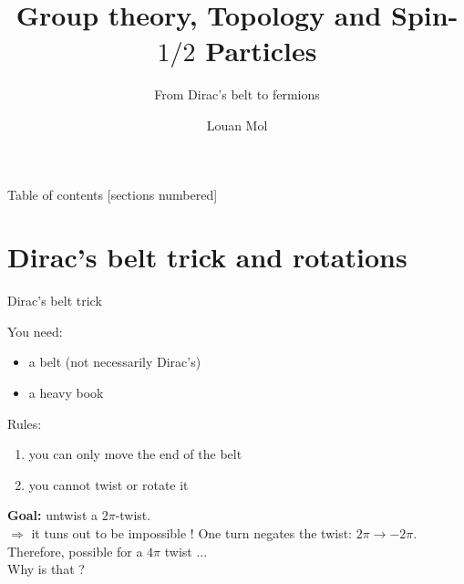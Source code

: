 \documentclass[9pt]{beamer}
\title{Group theory, Topology and Spin-$1/2$ Particles}
\subtitle{From Dirac's belt to fermions}
\date{}
\author{Louan Mol}
\institute{Unversité Libre de Bruxelles\\[2cm]{\small Brussels Summer School of Mathematics 2022}}
\renewcommand{\emph}{\alert}
\begin{document}
\maketitle

\nocite{*}

\begin{frame}{Table of contents}
    [sections numbered]
    \tableofcontents%
\end{frame}

\section{Dirac's belt trick and rotations}

\begin{frame}{Dirac's belt trick}
    
    You need:
    \begin{itemize}
      \item a belt (not necessarily Dirac's)
      \item a heavy book
    \end{itemize}
    Rules:
    \begin{enumerate}
      \item you can only move the end of the belt
      \item you cannot twist or rotate it
    \end{enumerate}
    \textbf{Goal:} untwist a $2\pi$-twist.\\[0.5cm]
      $\Rightarrow$ it tuns out to be \emph{impossible} ! One turn negates the twist: $2\pi\to-2\pi$. \\[0.5cm]

      Therefore, possible for a $4\pi$ twist ...\\ \hspace{7cm} Why is that ?

\end{frame}
\end{document}
